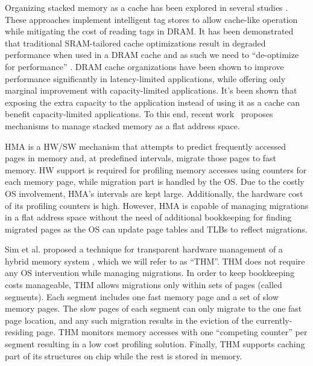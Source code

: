Organizing stacked memory as a cache has been explored in several studies \cite{qureshi-micro2012,BEAR,BIMODAL,citadel,tagless-dram-cache,UNISON}. These approaches implement intelligent tag stores to allow cache-like operation while
 mitigating the cost of reading tags in DRAM. It has been demonstrated that traditional SRAM-tailored cache optimizations result in degraded performance when used in a DRAM cache and as such we need to ``de-optimize for performance'' \cite{qureshi-micro2012}.  DRAM cache organizations have been shown to improve performance significantly in latency-limited applications, while offering only marginal improvement with capacity-limited applications. It's been shown that exposing the extra capacity to the application instead of using it as a cache can benefit capacity-limited applications. To this end, recent work~\cite{meswani-HPCA21,sim-micro2014,cameo} proposes mechanisms to manage stacked memory as a flat address space. 


HMA \cite{meswani-HPCA21} is a HW/SW mechanism that attempts to predict frequently accessed pages in memory and, at predefined intervals, migrate those pages to fast memory. HW support is required for profiling memory accesses using counters for each memory page, while migration part is handled by the OS. Due to the costly OS involvement, HMA's intervals are kept large.  Additionally, 
the hardware cost of its profiling counters is high. However, HMA is capable of managing migrations in a flat address space without the need of additional bookkeeping for finding migrated pages as the OS can update page tables and TLBs to reflect migrations.

Sim et al. proposed a technique for transparent hardware management of a hybrid memory system \cite{sim-micro2014}, which we will refer to as ``THM''.
THM does not require any OS intervention while managing migrations. In order to keep bookkeeping costs manageable, THM allows migrations only within sets of pages (called segments). Each segment includes one fast memory page and a set of slow memory pages. The slow pages of each segment can only migrate to the one fast page location, and any such migration results in the eviction of the currently-residing page. THM monitors memory accesses with one ``competing counter'' per segment resulting in a low cost profiling solution. Finally, THM supports caching part of its structures on chip while the rest is stored in memory.

